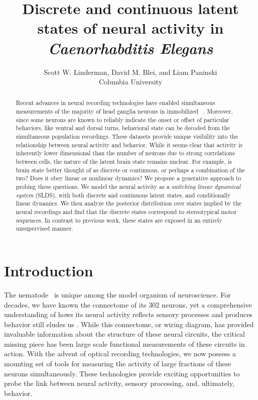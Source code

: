 \documentclass{article}
\title{Discrete and continuous latent states of neural activity in \textit{Caenorhabditis Elegans}}
\author{Scott W. Linderman,
  David M. Blei,
  and
  Liam Paninski
  \\
  Columbia University
}
\begin{document}
\singlespacing
\maketitle

\begin{abstract}
  Recent advances in neural recording technologies have enabled
  simultaneous measurements of the majority of head ganglia neurons in
  immobilized \celegans~\citep{kato2015global}. Moreover, since some
  neurons are known to reliably indicate the onset or offset of
  particular behaviors, like ventral and dorsal turns, behavioral
  state can be decoded from the simultaneous population recordings.
  These datasets provide unique visibility into the relationship
  between neural activity and behavior.  While it seems clear that
  activity is inherently lower dimensional than the number of neurons
  due to strong correlations between cells, the nature of the latent brain state
  remains unclear. For example, is brain state better thought of as
  discrete or continuous, or perhaps a combination of the two? Does it
  obey linear or nonlinear dynamics?  We propose a generative approach
  to probing these questions. We model the neural activity as a
  \emph{switching linear dynamical system} (SLDS), with both discrete
  and continuous latent states, and conditionally linear dynamics.  We
  then analyze the posterior distribution over states implied by the
  neural recordings and find that the discrete states correspond to
  stereotypical motor sequences. In contrast to previous work, these
  states are exposed in an entirely unsupervised manner.
\end{abstract}

\onehalfspacing

\section{Introduction}
The nematode \celegans~is unique among the model organism of
neuroscience. For decades, we have known the connectome of its 302
neurons, yet a comprehensive understanding of hows its neural activity
reflects sensory processes and produces behavior still eludes
us \citep{white1986structure}. While this connectome, or wiring diagram, has provided invaluable
information about the structure of these neural circuits, the critical
missing piece has been large scale functional measurements of these
circuits in action. With the advent of optical recording technologies,
we now possess a mounting set of tools for measuring the activity of large
fractions of these neurons simultaneously. These technologies provide
exciting opportunities to probe the link between neural activity,
sensory processing, and, ultimately, behavior.
\end{document}
